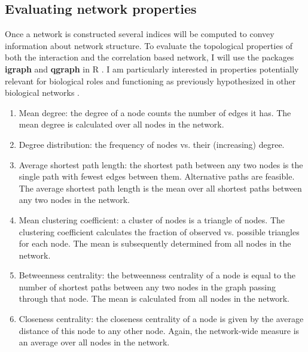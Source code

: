 \subsection*{Evaluating network properties}

Once a network is constructed several indices will be computed to convey information about network structure. To evaluate the topological properties of both the interaction and the correlation based network, I will use the packages \textbf{igraph} and \textbf{qgraph} in R . I am particularly interested in properties potentially relevant for biological roles and functioning as previously hypothesized in other biological networks .


\begin{enumerate}
\item Mean degree: the degree of a node counts the number of edges it has. The mean degree is calculated over all nodes in the network.
\item Degree distribution: the frequency of nodes vs. their (increasing) degree.
\item Average shortest path length: the shortest path between any two nodes is the single path with fewest edges between them. Alternative paths are feasible. The average shortest path length is the mean over all shortest paths between any two nodes in the network.
\item Mean clustering coefficient: a cluster of nodes is a triangle of nodes. The clustering coefficient calculates the fraction of observed vs. possible triangles for each node. The mean is subsequently determined from all nodes in the network.
\item Betweenness centrality: the betweenness centrality of a node is equal to the number of shortest paths between any two nodes in the graph passing through that node. The mean is calculated from all nodes in the network.
\item Closeness centrality: the closeness centrality of a node is given by the average distance of this node to any other node. Again, the network-wide measure is an average over all nodes in the network.
\end{enumerate}

